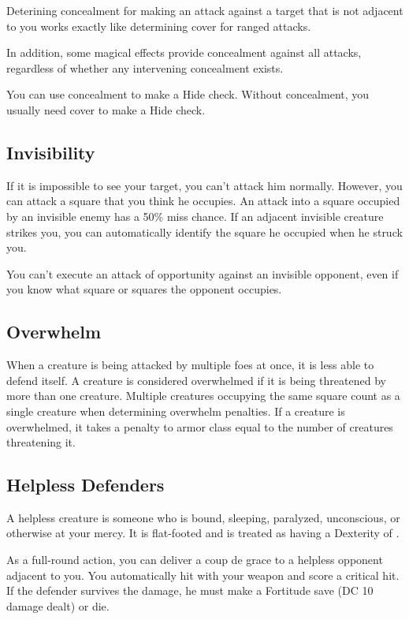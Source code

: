 Deterining concealment for making an attack against a target that is not adjacent to you works exactly like determining cover for ranged attacks.

In addition, some magical effects provide concealment against all attacks, regardless of whether any intervening concealment exists.

 You can use concealment to make a Hide check. Without concealment, you usually need cover to make a Hide check.

\subsection{Invisibility}
If it is impossible to see your target, you can't attack him normally. However, you can attack a square that you think he occupies. An attack into a square occupied by an invisible enemy has a 50\% miss chance. If an adjacent invisible creature strikes you, you can automatically identify the square he occupied when he struck you.

You can't execute an attack of opportunity against an invisible opponent, even if you know what square or squares the opponent occupies.

\subsection{Overwhelm}
When a creature is being attacked by multiple foes at once, it is less able to defend itself. A creature is considered overwhelmed if it is being threatened by more than one creature. Multiple creatures occupying the same square count as a single creature when determining overwhelm penalties. If a creature is overwhelmed, it takes a penalty to armor class equal to the number of creatures threatening it.

\subsection{Helpless Defenders}
A helpless creature is someone who is bound, sleeping, paralyzed, unconscious, or otherwise at your mercy. It is flat-footed and is treated as having a Dexterity of .

\label{Coup de Grace} As a full-round action, you can deliver a coup de grace to a helpless opponent adjacent to you. You automatically hit with your weapon and score a critical hit. If the defender survives the damage, he must make a Fortitude save (DC 10 \add damage dealt) or die.

